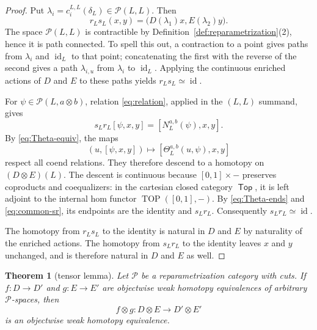 \documentclass[12pt,a4paper]{amsart}
\newcommand{\Top}{\mathop{\mathsf{Top}}}
\newcommand{\Pcat}{\mathcal P}
\newcommand{\id}{\operatorname{id}}
\newtheorem{thm}{Theorem}[section]
\theoremstyle{definition}
\begin{document}
\begin{proof}
Put \(\lambda_i=c^{L,L}_i(\delta_L)\in\Pcat(L,L)\).  Then
\[
 r_Ls_L(x,y)=\bigl(D(\lambda_1)x,E(\lambda_2)y\bigr).
\]
The space \(\Pcat(L,L)\) is contractible by
Definition~\ref{def:reparametrization}(2), hence it is path connected.  To
spell this out, a contraction to a point gives paths from \(\lambda_i\) and
\(\id_L\) to that point; concatenating the first with the reverse of the
second gives a path \(\lambda_{i,u}\) from \(\lambda_i\) to \(\id_L\).  Applying
the continuous enriched actions of \(D\) and \(E\) to these paths yields
\(r_Ls_L\simeq\id\).

For \(\psi\in\Pcat(L,a\otimes b)\), relation \eqref{eq:relation}, applied in
the \((L,L)\) summand, gives
\begin{equation}\label{eq:common-sr}
 s_Lr_L[\psi,x,y]=[N^{a,b}_L(\psi),x,y].
\end{equation}
By \eqref{eq:Theta-equiv}, the maps
\[
 (u,[\psi,x,y])\longmapsto
 [\Theta^{a,b}_L(u,\psi),x,y]
\]
respect all coend relations.  They therefore descend to a homotopy on \((D\otimes E)(L)\).  The descent is continuous because \([0,1]\times-\) preserves coproducts and coequalizers: in the cartesian closed category \(\Top\), it is left adjoint to the internal hom functor \(\operatorname{TOP}([0,1],-)\).  By \eqref{eq:Theta-ends} and \eqref{eq:common-sr}, its endpoints are the identity and \(s_Lr_L\). Consequently \(s_Lr_L\simeq\id\).  

The homotopy from \(r_Ls_L\) to the identity is natural in \(D\) and \(E\) by naturality of the enriched actions.  The homotopy from \(s_Lr_L\) to the identity leaves \(x\) and \(y\) unchanged, and is therefore natural in \(D\) and \(E\) as well.
\end{proof}

\begin{thm}[tensor lemma]\label{thm:tensor}
Let \(\Pcat\) be a reparametrization category with cuts.  If \(f: D\to D'\) and \(g: E\to E'\) are objectwise weak homotopy equivalences of arbitrary \(\Pcat\)-spaces, then
\[
 f\otimes g: D\otimes E\longrightarrow D'\otimes E'
\]
is an objectwise weak homotopy equivalence.
\end{thm}
\end{document}
